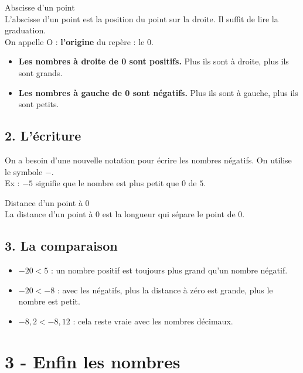 \begin{Definition}{Abscisse d'un point}\\
  L'abscisse d'un point est la position du point sur la droite. Il suffit de lire la graduation.\\
  On appelle O : \textbf{l'origine} du repère : le 0.
\end{Definition}


\begin{itemize}[label={$\bullet$}]
  \item \textbf{Les nombres à droite de 0 sont positifs.} Plus ils sont à droite, plus ils sont grands. 
  \item \textbf{Les nombres à gauche de 0 sont négatifs.} Plus ils sont à gauche, plus ils sont petits.
\end{itemize}   

\subsection*{2. L'écriture}

On a besoin d'une nouvelle notation pour écrire les nombres négatifs. On utilise le symbole $-$.\\

Ex : $-5$ signifie que le nombre est plus petit que $0$ de $5$.

\begin{Definition}{Distance d'un point à 0}\\
  La distance d'un point à 0 est la longueur qui sépare le point de 0.
\end{Definition}

\subsection*{3. La comparaison}

\begin{itemize}[label={$\bullet$}]
  \item $ -20 < 5$ : un nombre positif est toujours plus grand qu'un nombre négatif.
  \item $ -20 < -8$ : avec les négatifs, plus la distance à zéro est grande, plus le nombre est petit.
  \item $ -8,2 < -8,12$ : cela reste vraie avec les nombres décimaux.
\end{itemize}   


\section*{3 - Enfin les nombres}

